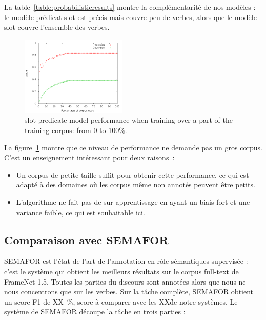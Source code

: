 La table~\ref{table:probabilisticresults} montre la complémentarité de nos
modèles : le modèle prédicat-slot est précis mais couvre peu de verbes, alors
que le modèle slot couvre l'ensemble des verbes.

\begin{figure}[t]
    \centering
    \includegraphics[width=0.45\textwidth]{fig/slot-predicate-percents.png}
    \caption{\label{fig:slot_predicate} slot-predicate model performance when training over a part of the training corpus: from 0 to 100\%.}
\end{figure}

La figure~\ref{fig:slot_predicate} montre que ce niveau de performance ne
demande pas un gros corpus. C'est un enseignement intéressant pour deux
raisons~:

\begin{itemize}

    \item Un corpus de petite taille suffit pour obtenir cette performance, ce
    qui est adapté à des domaines où les corpus même non annotés peuvent être
    petits.

    \item L'algorithme ne fait pas de sur-apprentissage en ayant un biais fort
    et une variance faible, ce qui est souhaitable ici.

\end{itemize}

\subsection{Comparaison avec SEMAFOR}

SEMAFOR \citep{das2014frame} est l'état de l'art de l'annotation en rôle
sémantiques supervisée : c'est le système qui obtient les meilleurs résultats
sur le corpus full-text de FrameNet 1.5. Toutes les parties du discours sont
annotées alors que nous ne nous concentrons que sur les verbes. Sur la tâche
complète, SEMAFOR obtient un score F1 de XX~\%, score à comparer avec les XX\~
de notre systèmes. Le système de SEMAFOR découpe la tâche en trois parties :

